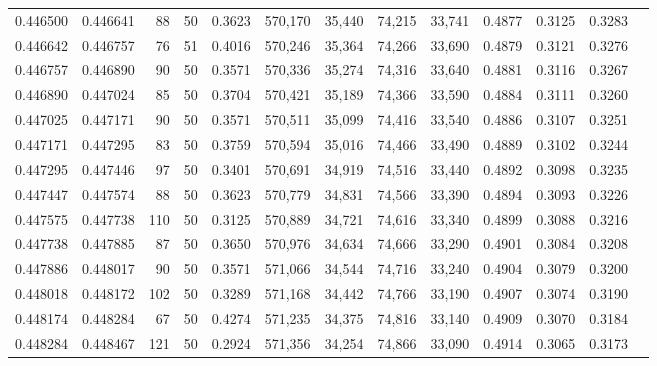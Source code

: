 \begin{tabular}{rrrrrrrrrrrrr}
0.446500 & 0.446641 &    88 &  50 &                                     0.3623 & 570,170 &  35,440 &  74,215 &  33,741 & 0.4877 & 0.3125 & 0.3283 \\
0.446642 & 0.446757 &    76 &  51 &                                     0.4016 & 570,246 &  35,364 &  74,266 &  33,690 & 0.4879 & 0.3121 & 0.3276 \\
0.446757 & 0.446890 &    90 &  50 &                                     0.3571 & 570,336 &  35,274 &  74,316 &  33,640 & 0.4881 & 0.3116 & 0.3267 \\
0.446890 & 0.447024 &    85 &  50 &                                     0.3704 & 570,421 &  35,189 &  74,366 &  33,590 & 0.4884 & 0.3111 & 0.3260 \\
0.447025 & 0.447171 &    90 &  50 &                                     0.3571 & 570,511 &  35,099 &  74,416 &  33,540 & 0.4886 & 0.3107 & 0.3251 \\
0.447171 & 0.447295 &    83 &  50 &                                     0.3759 & 570,594 &  35,016 &  74,466 &  33,490 & 0.4889 & 0.3102 & 0.3244 \\
0.447295 & 0.447446 &    97 &  50 &                                     0.3401 & 570,691 &  34,919 &  74,516 &  33,440 & 0.4892 & 0.3098 & 0.3235 \\
0.447447 & 0.447574 &    88 &  50 &                                     0.3623 & 570,779 &  34,831 &  74,566 &  33,390 & 0.4894 & 0.3093 & 0.3226 \\
0.447575 & 0.447738 &   110 &  50 &                                     0.3125 & 570,889 &  34,721 &  74,616 &  33,340 & 0.4899 & 0.3088 & 0.3216 \\
0.447738 & 0.447885 &    87 &  50 &                                     0.3650 & 570,976 &  34,634 &  74,666 &  33,290 & 0.4901 & 0.3084 & 0.3208 \\
0.447886 & 0.448017 &    90 &  50 &                                     0.3571 & 571,066 &  34,544 &  74,716 &  33,240 & 0.4904 & 0.3079 & 0.3200 \\
0.448018 & 0.448172 &   102 &  50 &                                     0.3289 & 571,168 &  34,442 &  74,766 &  33,190 & 0.4907 & 0.3074 & 0.3190 \\
0.448174 & 0.448284 &    67 &  50 &                                     0.4274 & 571,235 &  34,375 &  74,816 &  33,140 & 0.4909 & 0.3070 & 0.3184 \\
0.448284 & 0.448467 &   121 &  50 &                                     0.2924 & 571,356 &  34,254 &  74,866 &  33,090 & 0.4914 & 0.3065 & 0.3173 \\

\end{tabular}
